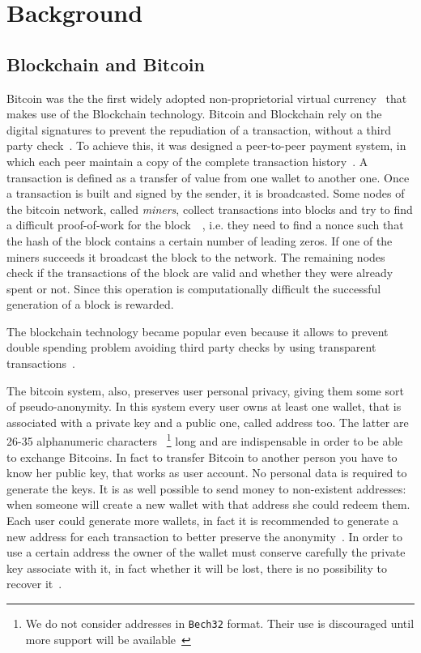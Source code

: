 \section{Background}
\subsection{Blockchain and Bitcoin}
Bitcoin was the the first widely adopted non-proprietorial virtual
currency~\cite{bib:respCrypto} that makes use of the
Blockchain technology. Bitcoin and Blockchain rely on the digital
signatures to prevent the repudiation of a transaction, without a third
party check~\cite{bib:anonAnalysis}.
To achieve this, it was designed a peer-to-peer payment system,
in which each peer maintain a copy of the complete transaction
history~\cite{bib:fistful}. A transaction is defined as a transfer of value
from one wallet to another one. Once a transaction is built and signed by the
sender, it is broadcasted. Some nodes of the bitcoin network, called
\textit{miners}, collect transactions into blocks and try to find a difficult
proof-of-work for the block~\cite{bib:pricing}~\cite{bib:hashcash}, i.e. they
need to find a nonce such that the hash of the block contains a certain number
of leading zeros. If one of the miners succeeds it broadcast the block to the
network. The remaining nodes check if the transactions of the block are valid
and whether they were already spent or not. Since this operation is
computationally difficult the successful generation of a block is
rewarded.~\cite{bib:satoshi}

The blockchain technology became popular even because it allows
to prevent double spending problem avoiding third party checks by using
transparent transactions~\cite{bib:bitcoinbeyond}.

The bitcoin system, also, preserves user personal privacy, giving them some
sort of pseudo-anonymity. In this system every user owns at least one wallet,
that is associated with a private key and a public one, called address too.
The latter are 26-35 alphanumeric characters~\cite{bib:bitcoinwiki:address}
\footnote{We do not consider addresses in \texttt{Bech32} format. Their use is
discouraged until more support will be available~\cite{bib:bitcoinwiki:bech32}}
long and are indispensable in order to be able to exchange Bitcoins.
In fact to transfer Bitcoin to another person you have to know her
public key, that works as user account. No personal data is required to generate
the keys. It is as well possible to send money to non-existent addresses: when
someone will create a new wallet with that address she could redeem
them. Each user could generate more wallets, in fact it is recommended
to generate a new address for each transaction to better preserve the
anonymity~\cite{bib:satoshi}. In order to use a certain address the owner of
the wallet must conserve carefully the private key associate with it, in fact
whether it will be lost, there is no possibility to recover
it~\cite{bib:respCrypto}.


